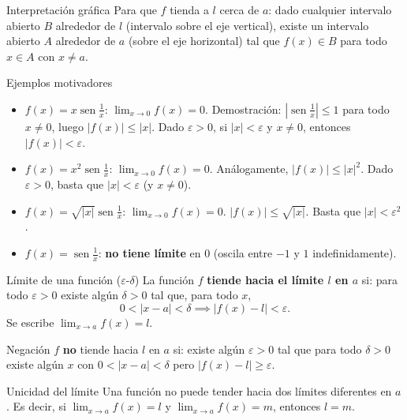 \documentclass[12pt]{article}
\begin{document}
\begin{nota}[]{Interpretación gráfica}
Para que $f$ tienda a $l$ cerca de $a$: dado cualquier intervalo abierto $B$ alrededor de $l$ (intervalo sobre el eje vertical), existe un intervalo abierto $A$ alrededor de $a$ (sobre el eje horizontal) tal que $f(x) \in B$ para todo $x \in A$ con $x \neq a$.
\end{nota}

\begin{observacion}[]{Ejemplos motivadores}
\begin{itemize}
  \item $f(x) = x\operatorname{sen}\tfrac{1}{x}$: $\lim_{x \to 0} f(x) = 0$.
    Demostración: $\left|\operatorname{sen}\tfrac{1}{x}\right| \leq 1$ para todo $x \neq 0$, luego $|f(x)| \leq |x|$. Dado $\varepsilon > 0$, si $|x| < \varepsilon$ y $x \neq 0$, entonces $|f(x)| < \varepsilon$.

  \item $f(x) = x^2\operatorname{sen}\tfrac{1}{x}$: $\lim_{x \to 0} f(x) = 0$.
    Análogamente, $|f(x)| \leq |x|^2$. Dado $\varepsilon > 0$, basta que $|x| < \varepsilon$ (y $x \neq 0$).

  \item $f(x) = \sqrt{|x|}\operatorname{sen}\tfrac{1}{x}$: $\lim_{x \to 0} f(x) = 0$.
    $|f(x)| \leq \sqrt{|x|}$. Basta que $|x| < \varepsilon^2$.

  \item $f(x) = \operatorname{sen}\tfrac{1}{x}$: \textbf{no tiene límite} en $0$ (oscila entre $-1$ y $1$ indefinidamente).
\end{itemize}
\end{observacion}

\begin{definicion}[]{Límite de una función ($\varepsilon$-$\delta$)}
La función $f$ \textbf{tiende hacia el límite $l$ en $a$} si: para todo $\varepsilon > 0$ existe algún $\delta > 0$ tal que, para todo $x$,
\[ 0 < |x - a| < \delta \implies |f(x) - l| < \varepsilon. \]
Se escribe $\displaystyle\lim_{x \to a} f(x) = l$.
\end{definicion}

\begin{nota}[]{Negación}
$f$ \textbf{no} tiende hacia $l$ en $a$ si: existe algún $\varepsilon > 0$ tal que para todo $\delta > 0$ existe algún $x$ con $0 < |x - a| < \delta$ pero $|f(x) - l| \geq \varepsilon$.
\end{nota}

\begin{teorema}[1]{Unicidad del límite}
Una función no puede tender hacia dos límites diferentes en $a$. Es decir, si $\displaystyle\lim_{x \to a} f(x) = l$ y $\displaystyle\lim_{x \to a} f(x) = m$, entonces $l = m$.
\end{teorema}
\end{document}
